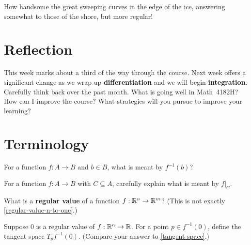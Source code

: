 \documentclass{homework}
\author{Jim Fowler}
\begin{document}
\maketitle

\begin{inspiration}
How handsome the great sweeping curves in the edge of the ice, answering somewhat to those of the shore, but more regular!
\end{inspiration}

\section{Reflection}

\begin{problem}
  This week marks about a third of the way through the course. Next week
  offers a significant change as we wrap up \textbf{differentiation}
  and we will begin \textbf{integration}. Carefully think back over
  the past month.  What is going well in Math~4182H? How can I improve
  the course?  What strategies will you pursue to improve your
  learning?
\end{problem}

\section{Terminology}

\begin{problem}
  For a function $f : A \to B$ and $b \in B$, what is meant by $f^{-1}(b)$?
\end{problem}

\begin{problem}
  For a function $f : A \to B$ with $C \subseteq A$, carefully explain what is meant by $f |_C$.
\end{problem}

\begin{problem}
  What is a \textbf{regular value} of a function $f : \mathbb{R}^n \to \mathbb{R}^m$? (This is not exactly \ref{regular-value-n-to-one}.)
\end{problem}

\begin{problem}
  Suppose $0$ is a regular value of $f : \mathbb{R}^n \to \mathbb{R}$. For a point $p \in f^{-1}(0)$, define the tangent space $T_p f^{-1}(0)$. (Compare your answer to \ref{tangent-space}.)
\end{problem}
\end{document}
